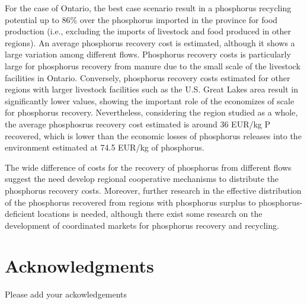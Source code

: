 \documentclass[authoryear]{elsarticle}
\begin{document}
For the case of Ontario, the best case scenario result in a phosphorus recycling potential up to 86\% over the phosphorus imported in the province for food production (i.e., excluding the imports of livestock and food produced in other regions). An average phosphorus recovery cost is estimated, although it shows a large variation among different flows. Phosphorus recovery costs is particularly large for phosphorus recovery from manure due to the small scale of the livestock facilities in Ontario. Conversely, phosphorus recovery costs estimated for other regions with larger livestock facilities such as the U.S. Great Lakes area result in significantly lower values, showing the important role of the economizes of scale for phosphorus recovery. Nevertheless, considering the region studied as a whole, the average phosphosrus recovery cost estimated is around 36 EUR/kg P recovered, which is lower than the economic losses of phosphorus releases into the environment estimated at 74.5 EUR/kg of phosphorus.

The wide difference of costs for the recovery of phosphorus from different flows suggest the need develop regional cooperative mechanisms to distribute the phosphorus recovery costs. Moreover, further research in the effective distribution of the phosphorus recovered from regions with phosphorus surplus to phosphorus-deficient locations is needed, although there exist some research on the development of coordinated markets for phosphorus recovery and recycling.


\section{Acknowledgments}
{\color{red}Please add your ackowledgements}
\end{document}
